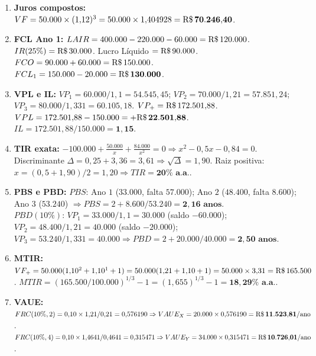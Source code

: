 \clearpage
{}

\begin{boxGabarito}
\begin{enumerate}[leftmargin=1.5em, itemsep=4pt]
  \item \textbf{Juros compostos:} $VF = 50.000 \times (1{,}12)^3 = 50.000 \times 1{,}404928 = \mathbf{\text{R\$\,}{70.246{,}40}}$.
  \item \textbf{FCL Ano 1:} $LAIR = 400.000 - 220.000 - 60.000 = \text{R\$\,}{120.000}$. $IR(25\%) = \text{R\$\,}{30.000}$. Lucro Líquido $= \text{R\$\,}{90.000}$. $FCO = 90.000 + 60.000 = \text{R\$\,}{150.000}$. $FCL_1 = 150.000 - 20.000 = \mathbf{\text{R\$\,}{130.000}}$.
  \item \textbf{VPL e IL:} $VP_1 = 60.000/1{,}1 = 54.545{,}45$; $VP_2 = 70.000/1{,}21 = 57.851{,}24$; $VP_3 = 80.000/1{,}331 = 60.105{,}18$. $VP_{+} = \text{R\$\,}{172.501{,}88}$. $VPL = 172.501{,}88 - 150.000 = \mathbf{+\text{R\$\,}{22.501{,}88}}$. $IL = 172.501{,}88 / 150.000 = \mathbf{1{,}15}$.
  \item \textbf{TIR exata:} $-100.000 + \frac{50.000}{x} + \frac{84.000}{x^2} = 0 \Rightarrow x^2 - 0{,}5x - 0{,}84 = 0$. Discriminante $\Delta = 0{,}25 + 3{,}36 = 3{,}61 \Rightarrow \sqrt{\Delta} = 1{,}90$. Raiz positiva: $x = (0{,}5 + 1{,}90)/2 = 1{,}20 \Rightarrow TIR = \mathbf{20\%\text{ a.a.}}$.
  \item \textbf{PBS e PBD:}
  $PBS$: Ano $1$ ($33.000$, falta $57.000$); Ano $2$ ($48.400$, falta $8.600$); Ano $3$ ($53.240$) $\Rightarrow PBS = 2 + 8.600/53.240 = \mathbf{2{,}16\text{ anos}}$. \\
  $PBD(10\%)$: $VP_1 = 33.000/1{,}1 = 30.000$ (saldo $-60.000$); $VP_2 = 48.400/1{,}21 = 40.000$ (saldo $-20.000$); $VP_3 = 53.240/1{,}331 = 40.000 \Rightarrow PBD = 2 + 20.000/40.000 = \mathbf{2{,}50\text{ anos}}$.
  \item \textbf{MTIR:} $VF_{+} = 50.000(1{,}10^2 + 1{,}10^1 + 1) = 50.000(1{,}21 + 1{,}10 + 1) = 50.000 \times 3{,}31 = \text{R\$\,}{165.500}$. $MTIR = (165.500 / 100.000)^{1/3} - 1 = (1{,}655)^{1/3} - 1 = \mathbf{18{,}29\%\text{ a.a.}}$.
  \item \textbf{VAUE:}
  $FRC(10\%, 2) = 0{,}10 \times 1{,}21 / 0{,}21 = 0{,}576190 \Rightarrow VAUE_X = 20.000 \times 0{,}576190 = \mathbf{\text{R\$\,}{11.523{,}81/\text{ano}}}$. \\
  $FRC(10\%, 4) = 0{,}10 \times 1{,}4641 / 0{,}4641 = 0{,}315471 \Rightarrow VAUE_Y = 34.000 \times 0{,}315471 = \mathbf{\text{R\$\,}{10.726{,}01/\text{ano}}}$. \\

\end{enumerate}
\end{boxGabarito}
